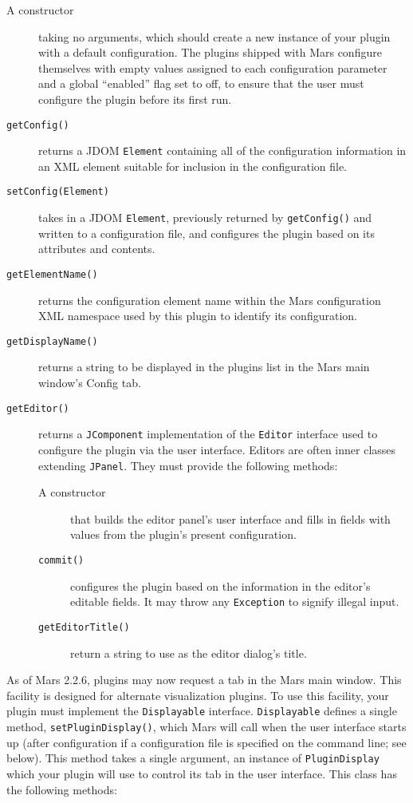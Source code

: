 \documentclass{article}
\newcommand{\identifier}[1]{{\tt #1}}
\newcommand{\guiitem}[1]{{\sf #1}}
\begin{document}
\begin{description}
\item[A constructor] taking no arguments, which should create a new instance of
your plugin with a default configuration. The plugins shipped with Mars
configure themselves with empty values assigned to each configuration parameter
and a global ``enabled'' flag set to off, to ensure that the user must
configure the plugin before its first run.
\item[\identifier{getConfig()}] returns a JDOM \identifier{Element} containing
all of the configuration information in an XML element suitable for inclusion
in the configuration file.
\item[\identifier{setConfig(Element)}] takes in a JDOM \identifier{Element},
previously returned by \identifier{getConfig()} and written to a configuration
file, and configures the plugin based on its attributes and contents.
\item[\identifier{getElementName()}] returns the configuration element name
within the Mars configuration XML namespace used by this plugin to identify its
configuration. 
\item[\identifier{getDisplayName()}] returns a string to be displayed in the
plugins list in the Mars main window's \guiitem{Config} tab.
\item[\identifier{getEditor()}] returns a \identifier{JComponent}
implementation of the \identifier{Editor} interface used to configure the
plugin via the user interface. Editors are often inner classes extending
\identifier{JPanel}. They must provide the following methods:
\begin{description}
\item[A constructor] that builds the editor panel's user interface and fills in
fields with values from the plugin's present configuration.
\item[\identifier{commit()}] configures the plugin based on the information in
the editor's editable fields. It may throw any \identifier{Exception} to
signify illegal input.
\item[\identifier{getEditorTitle()}] return a string to use as the editor
dialog's title.
\end{description}
\end{description}

As of Mars 2.2.6, plugins may now request a tab in the Mars main
window. This facility is designed for alternate visualization plugins.
To use this facility, your plugin must implement the
\identifier{Displayable} interface. \identifier{Displayable} defines a
single method, \identifier{setPluginDisplay()}, which Mars will call
when the user interface starts up (after configuration if a
configuration file is specified on the command line; see below). This
method takes a single argument, an instance of
\identifier{PluginDisplay} which your plugin will use to control its
tab in the user interface. This class has the following methods:
\end{document}
